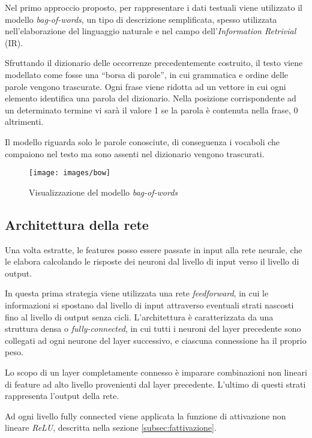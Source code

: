 Nel primo approccio proposto, per rappresentare i dati testuali viene utilizzato il modello \emph{bag-of-words}, un tipo di descrizione semplificata, spesso utilizzata nell'elaborazione del linguaggio naturale e nel campo dell'\emph{Information Retrivial} (IR). 

Sfruttando il dizionario delle occorrenze precedentemente costruito, il testo viene modellato  come fosse una ``borsa di parole'', in cui grammatica e ordine delle parole vengono trascurate.
Ogni frase viene ridotta ad un vettore in cui ogni elemento identifica una parola del dizionario. Nella posizione corrispondente ad un determinato termine vi sarà il valore \num{1} se la parola è contenuta nella frase, \num{0} altrimenti.

Il modello riguarda solo le parole conosciute, di conseguenza i vocaboli che compaiono nel testo ma sono assenti nel dizionario vengono trascurati.

\begin{figure}[H]
	\centering
	{\texttt{[image: images/bow]}}
	\caption{Visualizzazione del modello \emph{bag-of-words}}
	\label{fig:bow}
\end{figure}

\subsection{Architettura della rete}
\label{subsec:modelli1}

Una volta estratte, le features posso essere passate in input alla rete neurale, che le elabora calcolando le risposte dei neuroni dal livello di input verso il livello di output.

In questa prima strategia viene utilizzata una rete \emph{feedforward}, in cui le informazioni si spostano dal livello di input attraverso eventuali strati nascosti fino al livello di output senza cicli. L'architettura è caratterizzata da una struttura densa o \emph{fully-connected}, in cui tutti i neuroni del layer precedente sono collegati ad ogni neurone del layer successivo, e ciascuna connessione ha il proprio peso.


Lo scopo di un layer completamente connesso è imparare combinazioni non lineari di feature ad alto livello provenienti dal layer precedente. L'ultimo di questi strati rappresenta l’output della rete.

Ad ogni livello fully connected viene applicata la funzione di attivazione non lineare \emph{ReLU}, descritta nella sezione \ref{subsec:fattivazione}.

